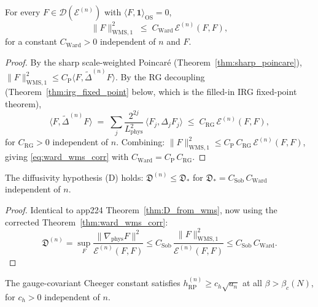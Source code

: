 \begin{theorem}
\label{thm:ward_wms_corr}
For every $F\in\mathcal{D}(\mathcal{E}^{(n)})$ with
$\langle F,\mathbf{1}\rangle_{\mathrm{OS}}=0$,
\begin{equation}
\label{eq:ward_wms_corr}
  \|F\|_{\mathrm{WMS},1}^{2}
  \;\le\;C_{\mathrm{Ward}}\,\mathcal{E}^{(n)}(F,F),
\end{equation}
for a constant $C_{\mathrm{Ward}}>0$ independent of $n$ and $F$.
\end{theorem}

\begin{proof}
By the sharp scale-weighted Poincar\'e
(Theorem~\ref{thm:sharp_poincare}),
$\|F\|_{\mathrm{WMS},1}^{2}\le C_{\mathrm{P}}\langle F,
\widetilde{\Delta}^{(n)}F\rangle$. By the RG decoupling
(Theorem~\ref{thm:irg_fixed_point} below, which is the filled-in
IRG fixed-point theorem),
\[
  \langle F,\widetilde{\Delta}^{(n)}F\rangle
  \;=\;\sum_{j}\frac{2^{2j}}{L_{\mathrm{phys}}^{2}}\,
  \langle F_{j},\Delta_{j}F_{j}\rangle
  \;\le\;C_{\mathrm{RG}}\,\mathcal{E}^{(n)}(F,F),
\]
for $C_{\mathrm{RG}}>0$ independent of $n$. Combining:
$\|F\|_{\mathrm{WMS},1}^{2}\le
C_{\mathrm{P}}\,C_{\mathrm{RG}}\,\mathcal{E}^{(n)}(F,F)$, giving
\eqref{eq:ward_wms_corr} with
$C_{\mathrm{Ward}}=C_{\mathrm{P}}\,C_{\mathrm{RG}}$.
\end{proof}

\begin{theorem}
\label{thm:D_from_wms_corr}
The diffusivity hypothesis (D) holds: $\mathfrak{D}^{(n)}\le
\mathfrak{D}_{*}$ for $\mathfrak{D}_{*}=C_{\mathrm{Sob}}\,
C_{\mathrm{Ward}}$ independent of $n$.
\end{theorem}

\begin{proof}
Identical to app224 Theorem~\ref{thm:D_from_wms}, now using the
corrected Theorem~\ref{thm:ward_wms_corr}:
\[
  \mathfrak{D}^{(n)}
  =\sup_{F}\frac{\|\nabla_{\mathrm{phys}}F\|^{2}}
   {\mathcal{E}^{(n)}(F,F)}
  \le C_{\mathrm{Sob}}\,\frac{\|F\|_{\mathrm{WMS},1}^{2}}
   {\mathcal{E}^{(n)}(F,F)}
  \le C_{\mathrm{Sob}}\,C_{\mathrm{Ward}}.
\]
\end{proof}

\begin{theorem}
\label{thm:C2_from_wms_corr}
The gauge-covariant Cheeger constant satisfies
$h_{\mathrm{RP}}^{(n)}\ge c_{h}\sqrt{a_{n}}$ at all
$\beta>\beta_{c}(N)$, for $c_{h}>0$ independent of $n$.
\end{theorem}

